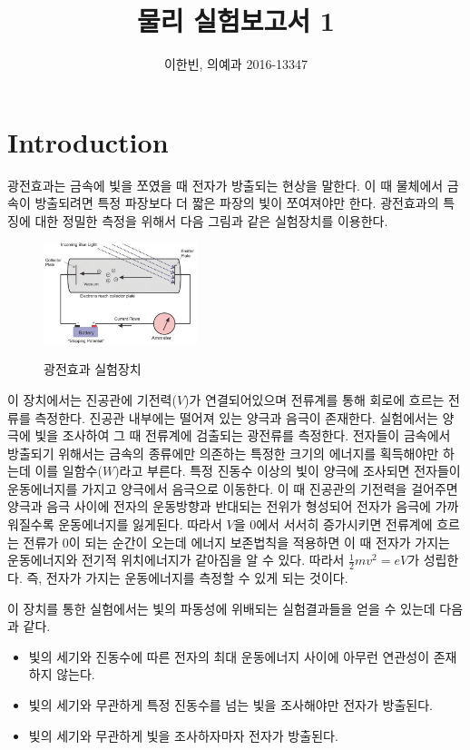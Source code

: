 \documentclass[a4paper]{article}
\title{물리 실험보고서 1}
\author{이한빈, 의예과 2016-13347}
\begin{document}
\maketitle

\section{Introduction}
	광전효과는 금속에 빛을 쪼였을 때 전자가 방출되는 현상을 말한다.
	이 때 물체에서 금속이 방출되려면 특정 파장보다 더 짧은 파장의 빛이 쪼여져야만 한다.
	광전효과의 특징에 대한 정밀한 측정을 위해서 다음 그림과 같은 실험장치를 이용한다.
	\begin{figure}[h]
		\centering
		\includegraphics[width=0.4\textwidth]{img/photoex.jpg}
		\label{fig:photoex} \caption{광전효과 실험장치}
	\end{figure}

	이 장치에서는 진공관에 기전력($V$)가 연결되어있으며 전류계를 통해 회로에 흐르는 전류를 측정한다.
	진공관 내부에는 떨어져 있는 양극과 음극이 존재한다.
	실험에서는 양극에 빛을 조사하여 그 때 전류계에 검출되는 광전류를 측정한다.
	전자들이 금속에서 방출되기 위해서는 금속의 종류에만 의존하는 특정한 크기의 에너지를 획득해야만 하는데 이를 일함수($W$)라고 부른다.
	특정 진동수 이상의 빛이 양극에 조사되면 전자들이 운동에너지를 가지고 양극에서 음극으로 이동한다.
	이 때 진공관의 기전력을 걸어주면 양극과 음극 사이에 전자의 운동방향과 반대되는 전위가 형성되어 전자가 음극에 가까워질수록 운동에너지를 잃게된다.
	따라서 $V$을 0에서 서서히 증가시키면 전류계에 흐르는 전류가 0이 되는 순간이 오는데 에너지 보존법칙을 적용하면 이 때 전자가 가지는 운동에너지와 전기적 위치에너지가 같아짐을 알 수 있다.
	따라서 $\frac{1}{2}mv^2 = eV$가 성립한다.
	즉, 전자가 가지는 운동에너지를 측정할 수 있게 되는 것이다.

	이 장치를 통한 실험에서는 빛의 파동성에 위배되는 실험결과들을 얻을 수 있는데 다음과 같다.
	\begin{itemize}
		\item 빛의 세기와 진동수에 따른 전자의 최대 운동에너지 사이에 아무런 연관성이 존재하지 않는다.
		\item 빛의 세기와 무관하게 특정 진동수를 넘는 빛을 조사해야만 전자가 방출된다.
		\item 빛의 세기와 무관하게 빛을 조사하자마자 전자가 방출된다.
	\end{itemize}
\end{document}
